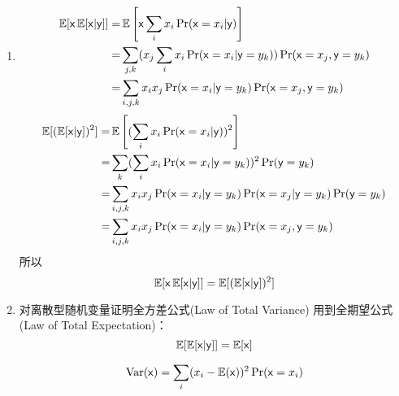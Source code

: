\documentclass[a4paper]{article}
\begin{document}
\begin{enumerate}[label=\thehwcnt.\arabic*.]
\begin{enumerate}[label=(\alph*)]
\begin{enumerate}[label=\roman*.]
      \item
        \begin{align*}
        \operatorname{\mathbb{E}}[\mathsf{x}\operatorname{\mathbb{E}}[\mathsf{x}|\mathsf{y}]]=&\operatorname{\mathbb{E}}\left[\mathsf{x}\sum_{i} x_i\Pr(\mathsf{x}=x_i|\mathsf{y})\right]\\
        =&\sum_{j,k}(x_j\sum_{i} x_i\Pr(\mathsf{x}=x_i|\mathsf{y}=y_k))\Pr(\mathsf{x}=x_j,\mathsf{y}=y_k)\\
        =&\sum_{i,j,k} x_i x_j \Pr(\mathsf{x}=x_i|\mathsf{y}=y_k)\Pr(\mathsf{x}=x_j,\mathsf{y}=y_k)
        \end{align*}
        \begin{align*}
        \operatorname{\mathbb{E}}[(\operatorname{\mathbb{E}}[\mathsf{x}|\mathsf{y}])^2]=&\operatorname{\mathbb{E}}\left[(\sum_{i} x_i\Pr(\mathsf{x}=x_i|\mathsf{y}))^2\right]\\
        =&\sum_{k}(\sum_{i} x_i\Pr(\mathsf{x}=x_i|\mathsf{y}=y_k))^2 \Pr(\mathsf{y}=y_k)\\
        =&\sum_{i,j,k} x_i x_j\Pr(\mathsf{x}=x_i|\mathsf{y}=y_k)\Pr(\mathsf{x}=x_j|\mathsf{y}=y_k)\Pr(\mathsf{y}=y_k)\\
        =&\sum_{i,j,k} x_i x_j\Pr(\mathsf{x}=x_i|\mathsf{y}=y_k)\Pr(\mathsf{x}=x_j,\mathsf{y}=y_k)
        \end{align*}
        所以
        \begin{equation}
        \operatorname{\mathbb{E}}[\mathsf{x}\operatorname{\mathbb{E}}[\mathsf{x}|\mathsf{y}]]=\operatorname{\mathbb{E}}[(\operatorname{\mathbb{E}}[\mathsf{x}|\mathsf{y}])^2]
        \end{equation}
      \item
        对离散型随机变量证明全方差公式(Law of Total Variance)
        用到全期望公式(Law of Total Expectation)：
        \begin{equation}
        \operatorname{\mathbb{E}}[\operatorname{\mathbb{E}}[\mathsf{x}|\mathsf{y}]]=\operatorname{\mathbb{E}}[\mathsf{x}]
        \end{equation}

        \begin{equation}
        \operatorname{Var}(\mathsf{x})=\sum_i (x_i-\operatorname{\mathbb{E}}(\mathsf{x}))^2\Pr(\mathsf{x}=x_i)
        \end{equation}


\end{enumerate}
\end{enumerate}
\end{enumerate}
\end{document}
